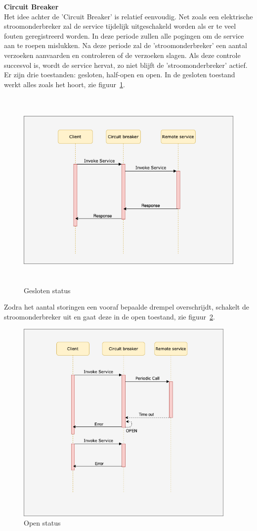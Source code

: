 \textbf{Circuit Breaker}\\
Het idee achter de 'Circuit Breaker' is relatief eenvoudig. Net zoals een elektrische stroomonderbreker zal de service tijdelijk uitgeschakeld worden als er te veel fouten geregistreerd worden. In deze periode zullen alle pogingen om de service aan te roepen mislukken. Na deze periode zal de 'stroomonderbreker' een aantal verzoeken aanvaarden en controleren of de verzoeken slagen. Als deze controle succesvol is, wordt de service hervat, zo niet blijft de 'stroomonderbreker' actief.
Er zijn drie toestanden: gesloten, half-open en open. In de gesloten toestand werkt alles zoals het hoort, zie figuur~\ref{gesloten}. 

\begin{figure}[!htb]
    \centering
    \includegraphics[height=10cm]{closed.png}
    \caption{Gesloten status \label{gesloten}}
\end{figure}

Zodra het aantal storingen een vooraf bepaalde drempel overschrijdt, schakelt de stroomonderbreker uit en gaat deze in de open toestand, zie figuur~\ref{open}.
\begin{figure}[!htb]
    \centering
    \includegraphics[height=10cm]{open.png}
    \caption{Open status \label{open}}
\end{figure}

